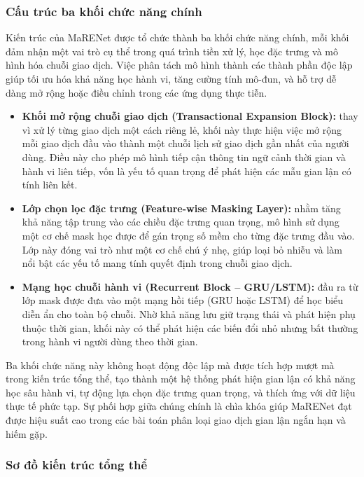 \subsubsection{Cấu trúc ba khối chức năng chính}

Kiến trúc của MaRENet được tổ chức thành ba khối chức năng chính, mỗi khối đảm nhận một vai trò cụ thể trong quá trình tiền xử lý, học đặc trưng và mô hình hóa chuỗi giao dịch. Việc phân tách mô hình thành các thành phần độc lập giúp tối ưu hóa khả năng học hành vi, tăng cường tính mô-đun, và hỗ trợ dễ dàng mở rộng hoặc điều chỉnh trong các ứng dụng thực tiễn.

\begin{itemize}
    \item \textbf{Khối mở rộng chuỗi giao dịch (Transactional Expansion Block):} thay vì xử lý từng giao dịch một cách riêng lẻ, khối này thực hiện việc mở rộng mỗi giao dịch đầu vào thành một chuỗi lịch sử giao dịch gần nhất của người dùng. Điều này cho phép mô hình tiếp cận thông tin ngữ cảnh thời gian và hành vi liên tiếp, vốn là yếu tố quan trọng để phát hiện các mẫu gian lận có tính liên kết.

    \item \textbf{Lớp chọn lọc đặc trưng (Feature-wise Masking Layer):} nhằm tăng khả năng tập trung vào các chiều đặc trưng quan trọng, mô hình sử dụng một cơ chế mask học được để gán trọng số mềm cho từng đặc trưng đầu vào. Lớp này đóng vai trò như một cơ chế chú ý nhẹ, giúp loại bỏ nhiễu và làm nổi bật các yếu tố mang tính quyết định trong chuỗi giao dịch.

    \item \textbf{Mạng học chuỗi hành vi (Recurrent Block – GRU/LSTM):} đầu ra từ lớp mask được đưa vào một mạng hồi tiếp (GRU hoặc LSTM) để học biểu diễn ẩn cho toàn bộ chuỗi. Nhờ khả năng lưu giữ trạng thái và phát hiện phụ thuộc thời gian, khối này có thể phát hiện các biến đổi nhỏ nhưng bất thường trong hành vi người dùng theo thời gian.
\end{itemize}

Ba khối chức năng này không hoạt động độc lập mà được tích hợp mượt mà trong kiến trúc tổng thể, tạo thành một hệ thống phát hiện gian lận có khả năng học sâu hành vi, tự động lựa chọn đặc trưng quan trọng, và thích ứng với dữ liệu thực tế phức tạp. Sự phối hợp giữa chúng chính là chìa khóa giúp MaRENet đạt được hiệu suất cao trong các bài toán phân loại giao dịch gian lận ngắn hạn và hiếm gặp.

\subsubsection{Sơ đồ kiến trúc tổng thể}

